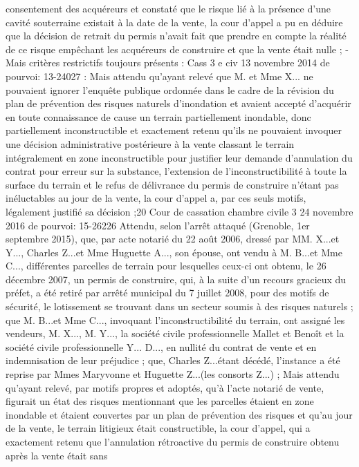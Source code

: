 \documentclass[11pt,a4paper]{report}
\begin{document}
	consentement des acquéreurs et constaté que le risque lié à la présence d'une cavité souterraine existait à la
	date de la vente, la cour d'appel a pu en déduire que la décision de retrait du permis n'avait fait que prendre
	en compte la réalité de ce risque empêchant les acquéreurs de construire et que la vente était nulle ;
	- Mais critères restrictifs toujours présents : Cass 3 e civ 13 novembre 2014 \No  de pourvoi: 13-24027 :
	Mais attendu qu'ayant relevé que M. et Mme X... ne pouvaient ignorer l'enquête publique ordonnée dans le
	cadre de la révision du plan de prévention des risques naturels d'inondation et avaient accepté d'acquérir en
	toute connaissance de cause un terrain partiellement inondable, donc partiellement inconstructible et
	exactement retenu qu'ils ne pouvaient invoquer une décision administrative postérieure à la vente classant le
	terrain intégralement en zone inconstructible pour justifier leur demande d'annulation du contrat pour
	erreur sur la substance, l'extension de l'inconstructibilité à toute la surface du terrain et le refus de
	délivrance du permis de construire n'étant pas inéluctables au jour de la vente, la cour d'appel a, par ces
	seuls motifs, légalement justifié sa décision ;20
	Cour de cassation chambre civile 3 24 novembre 2016 \No  de pourvoi: 15-26226
	Attendu, selon l'arrêt attaqué (Grenoble, 1er septembre 2015), que, par acte notarié du 22 août 2006, dressé
	par MM. X...et Y..., Charles Z...et Mme Huguette A..., son épouse, ont vendu à M. B...et Mme C..., différentes
	parcelles de terrain pour lesquelles ceux-ci ont obtenu, le 26 décembre 2007, un permis de construire, qui, à
	la suite d'un recours gracieux du préfet, a été retiré par arrêté municipal du 7 juillet 2008, pour des motifs
	de sécurité, le lotissement se trouvant dans un secteur soumis à des risques naturels ; que M. B...et Mme C...,
	invoquant l'inconstructibilité du terrain, ont assigné les vendeurs, M. X..., M. Y..., la société civile
	professionnelle Mallet et Benoît et la société civile professionnelle Y... D..., en nullité du contrat de vente et
	en indemnisation de leur préjudice ; que, Charles Z...étant décédé, l'instance a été reprise par Mmes
	Maryvonne et Huguette Z...(les consorts Z...) ;
	Mais attendu qu'ayant relevé, par motifs propres et adoptés, qu'à l'acte notarié de vente, figurait un état des
	risques mentionnant que les parcelles étaient en zone inondable et étaient couvertes par un plan de
	prévention des risques et qu'au jour de la vente, le terrain litigieux était constructible, la cour d'appel, qui a
	exactement retenu que l'annulation rétroactive du permis de construire obtenu après la vente était sans
\end{document}
